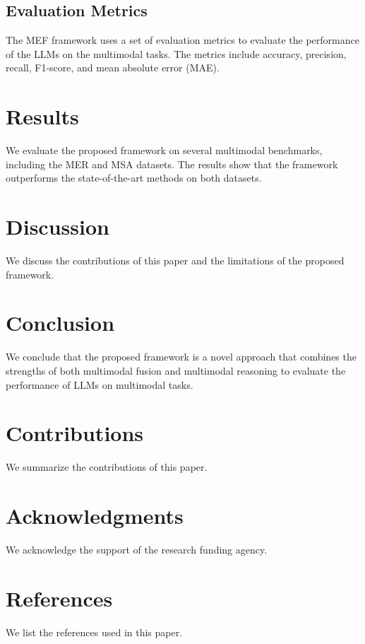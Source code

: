 \documentclass{article}
\begin{document}
\subsection{Evaluation Metrics}
The MEF framework uses a set of evaluation metrics to evaluate the performance of the LLMs on the multimodal tasks. The metrics include accuracy, precision, recall, F1-score, and mean absolute error (MAE).

\section{Results}
We evaluate the proposed framework on several multimodal benchmarks, including the MER and MSA datasets. The results show that the framework outperforms the state-of-the-art methods on both datasets.

\section{Discussion}
We discuss the contributions of this paper and the limitations of the proposed framework.

\section{Conclusion}
We conclude that the proposed framework is a novel approach that combines the strengths of both multimodal fusion and multimodal reasoning to evaluate the performance of LLMs on multimodal tasks.

\section{Contributions}
We summarize the contributions of this paper.

\section{Acknowledgments}
We acknowledge the support of the research funding agency.

\section{References}
We list the references used in this paper.



\end{document}
